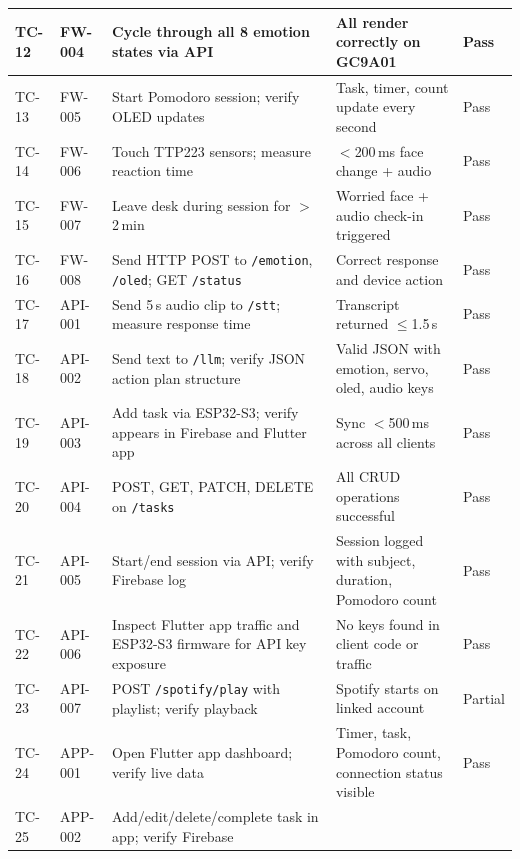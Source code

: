 \documentclass[12pt,a4paper]{article}
\begin{document}
\begin{center}
\begin{tabular}{|C{0.06\textwidth}|C{0.07\textwidth}|L{0.30\textwidth}|L{0.25\textwidth}|C{0.08\textwidth}|}
TC-12 & FW-004 & Cycle through all 8 emotion states via API &
                  All render correctly on GC9A01 & Pass \\ \hline
TC-13 & FW-005 & Start Pomodoro session; verify OLED updates &
                  Task, timer, count update every second & Pass \\ \hline
TC-14 & FW-006 & Touch TTP223 sensors; measure reaction time &
                  $<$200\,ms face change + audio & Pass \\ \hline
TC-15 & FW-007 & Leave desk during session for $>$2\,min &
                  Worried face + audio check-in triggered & Pass \\ \hline
TC-16 & FW-008 & Send HTTP POST to \texttt{/emotion}, \texttt{/oled};
                  GET \texttt{/status} & Correct response and
                  device action & Pass \\ \hline
TC-17 & API-001 & Send 5\,s audio clip to \texttt{/stt}; measure
                   response time & Transcript returned $\leq$1.5\,s & Pass \\ \hline
TC-18 & API-002 & Send text to \texttt{/llm}; verify JSON action
                   plan structure & Valid JSON with emotion, servo,
                   oled, audio keys & Pass \\ \hline
TC-19 & API-003 & Add task via ESP32-S3; verify appears in Firebase
                   and Flutter app & Sync $<$500\,ms across all
                   clients & Pass \\ \hline
TC-20 & API-004 & POST, GET, PATCH, DELETE on \texttt{/tasks} &
                   All CRUD operations successful & Pass \\ \hline
TC-21 & API-005 & Start/end session via API; verify Firebase log &
                   Session logged with subject, duration,
                   Pomodoro count & Pass \\ \hline
TC-22 & API-006 & Inspect Flutter app traffic and ESP32-S3 firmware
                   for API key exposure & No keys found in client
                   code or traffic & Pass \\ \hline
TC-23 & API-007 & POST \texttt{/spotify/play} with playlist; verify
                   playback & Spotify starts on linked account & Partial \\ \hline
TC-24 & APP-001 & Open Flutter app dashboard; verify live data &
                   Timer, task, Pomodoro count, connection
                   status visible & Pass \\ \hline
TC-25 & APP-002 & Add/edit/delete/complete task in app; verify Firebase

\end{tabular}
\end{center}
\end{document}

